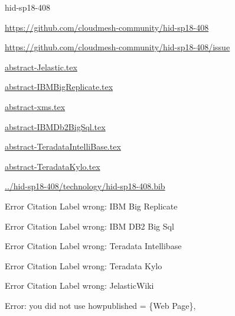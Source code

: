 \begin{IU}

hid-sp18-408

\url{https://github.com/cloudmesh-community/hid-sp18-408}

\url{https://github.com/cloudmesh-community/hid-sp18-408/issue}

\href{https://github.com/cloudmesh-community/hid-sp18-408/blob/master//technology/abstract-Jelastic.tex}{abstract-Jelastic.tex}

\href{https://github.com/cloudmesh-community/hid-sp18-408/blob/master//technology/abstract-IBMBigReplicate.tex}{abstract-IBMBigReplicate.tex}

\href{https://github.com/cloudmesh-community/hid-sp18-408/blob/master//technology/abstract-xms.tex}{abstract-xms.tex}

\href{https://github.com/cloudmesh-community/hid-sp18-408/blob/master//technology/abstract-IBMDb2BigSql.tex}{abstract-IBMDb2BigSql.tex}

\href{https://github.com/cloudmesh-community/hid-sp18-408/blob/master//technology/abstract-TeradataIntelliBase.tex}{abstract-TeradataIntelliBase.tex}

\href{https://github.com/cloudmesh-community/hid-sp18-408/blob/master//technology/abstract-TeradataKylo.tex}{abstract-TeradataKylo.tex}

\href{https://github.com/cloudmesh-community/hid-sp18-408/blob/master//technology/hid-sp18-408.bib}{../hid-sp18-408/technology/hid-sp18-408.bib}

 Error Citation Label wrong: IBM Big Replicate

 Error Citation Label wrong: IBM DB2 Big Sql

 Error Citation Label wrong: Teradata Intellibase

 Error Citation Label wrong: Teradata Kylo

 Error Citation Label wrong: JelasticWiki

Error: you did not use howpublished = \{Web Page\},

\end{IU}


